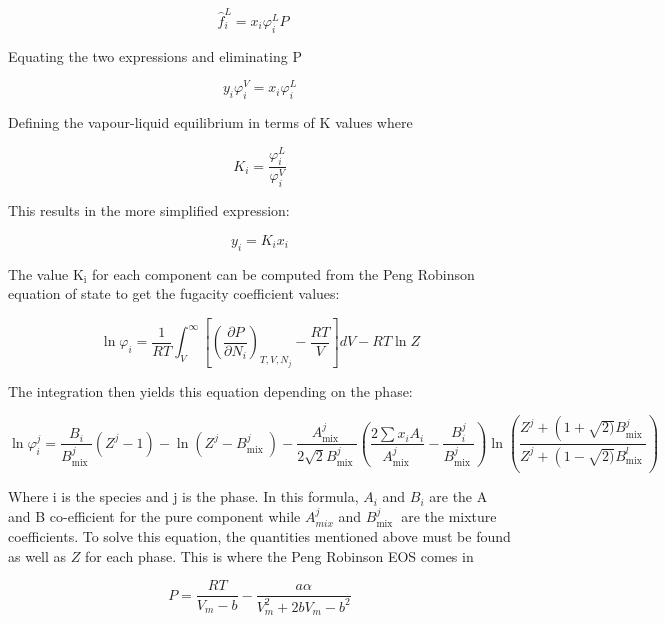 \begin{equation}
\hat{f}_i^L=x_i \varphi_i^L P \quad
\end{equation}

Equating the two expressions and eliminating $\mathrm{P}$

\begin{equation}
y_i \varphi_i^V=x_i \varphi_i^L
\end{equation}

Defining the vapour-liquid equilibrium in terms of $\mathrm{K}$ values where

\begin{equation}
K_i=\frac{\varphi_i^L}{\varphi_i^V}
\end{equation}

This results in the more simplified expression:

\begin{equation}
y_i=K_i x_i
\end{equation}

The value $\mathrm{K}_{\mathrm{i}}$ for each component can be computed from the Peng Robinson equation of state to get the fugacity coefficient values:

\begin{equation}
\ln \varphi_i=\frac{1}{R T} \int_V^{\infty}\left[\left(\frac{\partial P}{\partial N_i}\right)_{T, V, N_j}-\frac{R T}{V}\right] d V-R T \ln Z
\end{equation}

The integration then yields this equation depending on the phase:

\begin{equation}
\ln \varphi_i^j=\frac{B_i}{B_{\text {mix }}^j}\left(Z^j-1\right)-\ln \left(Z^j-B_{\text {mix }}^j\right)-\frac{A_{\text {mix }}^j}{2 \sqrt{2} B_{\text {mix }}^j}\left(\frac{2 \sum x_i A_i}{A_{\text {mix }}^j}-\frac{B_i^j}{B_{\text {mix }}^j}\right) \ln \left(\frac{Z^j+\left(1+\sqrt{2)} B_{\text {mix }}^j\right.}{Z^j+\left(1-\sqrt{2)} B_{\text {mix }}^l\right.}\right)
\end{equation}

Where $\mathrm{i}$ is the species and $\mathrm{j}$ is the phase.  In this formula, $A_i$ and $B_i$ are the A and B co-efficient for the pure component while $A_{m i x}^j$ and $B_{\text {mix }}^j$ are the mixture coefficients.  To solve this equation, the quantities mentioned above must be found as well as $Z$ for each phase. This is where the Peng Robinson EOS comes in


\begin{equation}
P=\frac{R T}{V_m-b}-\frac{a \alpha}{V_m^2+2 b V_m-b^2}
\end{equation}

